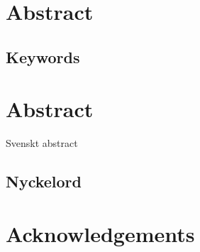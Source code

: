 \newpage

\section*{Abstract}


\subsection*{Keywords}







\newpage
\section*{Abstract}
Svenskt abstract


\subsection*{Nyckelord}



\newpage
\section*{Acknowledgements}







\newpage
\thispagestyle{empty}

